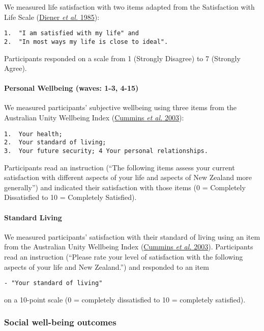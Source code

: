 \documentclass[
  singlecolumn,
  9pt]{article}
\let\oldparagraph\paragraph
\renewcommand{\paragraph}[1]{\oldparagraph{#1}\mbox{}}
\begin{document}
We measured life satisfaction with two items adapted from the
Satisfaction with Life Scale (\hyperref[ref-diener1985]{Diener \emph{et
al.} 1985}):

\begin{verbatim}
1.  "I am satisfied with my life" and
2.  "In most ways my life is close to ideal".
\end{verbatim}

Participants responded on a scale from 1 (Strongly Disagree) to 7
(Strongly Agree).

\paragraph{Personal Wellbeing (waves: 1-3,
4-15)}\label{personal-wellbeing-waves-1-3-4-15}

We measured participants' subjective wellbeing using three items from
the Australian Unity Wellbeing Index
(\hyperref[ref-cummins_developing_2003]{Cummins \emph{et al.} 2003}):

\begin{verbatim}
1.  Your health;
2.  Your standard of living;
3.  Your future security; 4 Your personal relationships.
\end{verbatim}

Participants read an instruction (``The following items assess your
current satisfaction with different aspects of your life and aspects of
New Zealand more generally'') and indicated their satisfaction with
those items (0 = Completely Dissatisfied to 10 = Completely Satisfied).

\paragraph{Standard Living}\label{standard-living}

We measured participants' satisfaction with their standard of living
using an item from the Australian Unity Wellbeing Index
(\hyperref[ref-cummins_developing_2003]{Cummins \emph{et al.} 2003}).
Participants read an instruction (``Please rate your level of
satisfaction with the following aspects of your life and New Zealand.'')
and responded to an item

\begin{verbatim}
- "Your standard of living"
\end{verbatim}

on a 10-point scale (0 = completely dissatisfied to 10 = completely
satisfied).

\subsubsection{Social well-being
outcomes}\label{social-well-being-outcomes}
\end{document}
